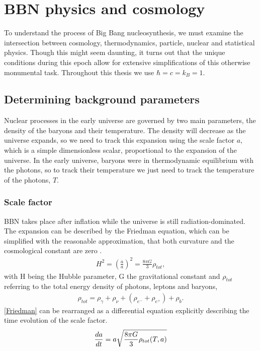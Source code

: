 
\chapter{BBN physics and cosmology}
\label{chap:theory}

To understand the process of Big Bang nucleosynthesis, we must examine the intersection between cosmology, thermodynamics, particle, nuclear and statistical physics. Though this might seem daunting, it turns out that the unique conditions during this epoch allow for extensive simplifications of this otherwise monumental task. Throughout this thesis we use $\hbar=c=k_B=1$.



\section{Determining background parameters}
\label{sec:Background}
Nuclear processes in the early universe are governed by two main parameters, the density of the baryons and their temperature. The density will decrease as the universe expands, so we need to track this expansion using the scale factor $a$, which is a simple dimensionless scalar, proportional to the expansion of the universe. In the early universe, baryons were in thermodynamic equilibrium with the photons, so to track their temperature we just need to track the temperature of the photons, $T$. 


\subsection{Scale factor}
\label{ssec:cosmology}

BBN takes place after inflation while the universe is still radiation-dominated. The expansion can be described by the Friedman equation, which can be simplified with the reasonable approximation, that both curvature and the cosmological constant are zero \cite[{(4.29)}]{Ryden}. 
\begin{align}
    H^2=\left(\frac{\dot{a}}{a}\right)^2=\frac{8\pi G}{3}\rho_{tot},
    \label{Friedman}
\end{align}
with H being the Hubble parameter, G the gravitational constant and $\rho_{tot}$ referring to the total energy density of photons, leptons and baryons,
\begin{align}
    \rho_{tot}=\rho_{\gamma}+\rho_{\nu}+(\rho_{e^-}+\rho_{e^+})+\rho_{b}.
\end{align}
\eqref{Friedman} can be rearranged as a differential equation explicitly describing the time evolution of the scale factor.
\begin{align}
    \frac{da}{dt}=a\sqrt{\frac{8\pi G}{3}\rho_{tot}(T,a)}
    \label{eq:dadt}
\end{align}

